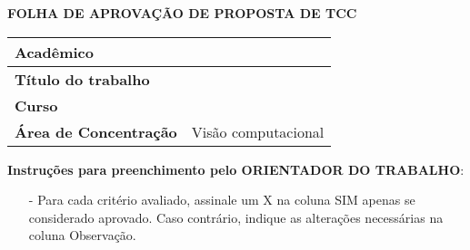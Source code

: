 \imprimircapa

\imprimirfolhaderosto

\begin{folhadeaprovacao}
	\small
	\begin{snugshade}
		\begin{center}
			{\textbf{FOLHA DE APROVAÇÃO DE PROPOSTA DE TCC}}
		\end{center}
	\end{snugshade}
	\vspace{-18pt}

	\footnotesize
	\begin{quadro}[htb]
		\centering
		\label{qua:folha_aprov}
		\begin{tabular}{|l|p{10.5cm}|}
			\hline
			\textbf{Acadêmico}            & \imprimirautor      \\ \hline
			\textbf{Título do trabalho}   & \imprimirtitulo     \\ \hline
			\textbf{Curso}                & \imprimirprograma   \\ \hline
			\textbf{Área de Concentração} & Visão computacional \\ \hline
		\end{tabular}
	\end{quadro}

	\vspace{-14pt}

	\noindent \textbf{Instruções para preenchimento pelo ORIENTADOR DO TRABALHO}:
	\begin{itemize}[leftmargin=*,noitemsep,topsep=0pt]
		\item[-] Para cada critério avaliado, assinale um X na coluna SIM apenas se considerado aprovado. Caso contrário, indique as alterações necessárias na coluna Observação.
	\end{itemize}

	\vspace{-4pt}


\end{folhadeaprovacao}
